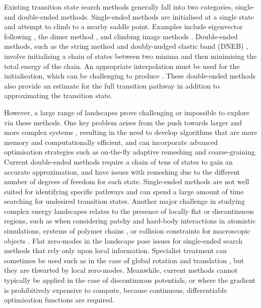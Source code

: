 \documentclass[twocolumn,10pt]{revtex4-2}
\begin{document}
Existing transition state search methods generally fall into two categories, single- and double-ended methods.
Single-ended methods are initialised at a single state and attempt to climb to a nearby saddle point.
Examples include eigenvector following \cite{Cerjan1981}, the dimer method \cite{Heyden2005,Kastner2008,Zhang2016}, and climbing image methods \cite{E2007,Ren2013}.
Double-ended methods, such as the string method \cite{E2002,E2007} and doubly-nudged elastic band (DNEB) \cite{Trygubenko2004}, involve initialising a chain of states between two minima and then minimising the total energy of the chain.
An appropriate interpolation must be used for the initialisation, which can be challenging to produce \cite{Wales2012a}.
These double-ended methods also provide an estimate for the full transition pathway in addition to approximating the transition state.

However, a large range of landscapes prove challenging or impossible to explore via these methods.
One key problem arises from the push towards larger and more complex systems \cite{Trefethen2013,Shalf2020,Alexander2020}, resulting in the need to develop algorithms that are more memory and computationally efficient, and can incorporate advanced optimisation strategies such as on-the-fly adaptive remeshing and coarse-graining.
Current double-ended methods require a chain of tens of states to gain an accurate approximation, and have issues with remeshing due to the different number of degrees of freedom for each state.
Single-ended methods are not well suited for identifying specific pathways and can spend a large amount of time searching for undesired transition states.
Another major challenge in studying complex energy landscapes relates to the presence of locally flat or discontinuous regions, such as when considering patchy \cite{McMullen2018,Nguemaha2018,Chen2018b} and hard-body \cite{Richard2018,Santra2018} interactions in atomistic simulations, systems of polymer chains \cite{Mokkonen2016}, or collision constraints for macroscopic objects \cite{Wriggers2006}.
Flat zero-modes in the landscape pose issues for single-ended search methods that rely only upon local information.
Specialist treatment can sometimes be used such as in the case of global rotation and translation \cite{Page1988}, but they are thwarted by local zero-modes.
Meanwhile, current methods cannot typically be applied in the case of discontinuous potentials, or where the gradient is prohibitively expensive to compute, because continuous, differentiable optimisation functions are required.
\end{document}
